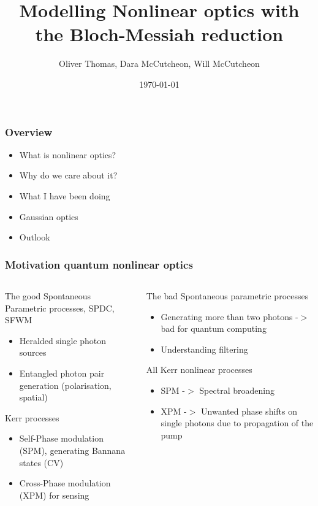\documentclass{beamer}
\title{Modelling Nonlinear optics with the Bloch-Messiah reduction}
\author{Oliver Thomas, Dara McCutcheon, Will McCutcheon}
\institute{Quantum Engineering CDT \\ University of Bristol}
\date{\today}
\begin{document}
\frame{\titlepage}

\begin{frame}
\frametitle{Overview}
\begin{itemize}
	\item What is nonlinear optics?
    \item Why do we care about it?
    \item What I have been doing
    \item Gaussian optics 
    \item Outlook
\end{itemize}
\end{frame}

\begin{frame}
\frametitle{Motivation quantum nonlinear optics}
\begin{columns}
    \begin{block}{The good}
    Spontaneous Parametric processes, SPDC, SFWM
    \begin{itemize}
        \item Heralded single photon sources
        \item Entangled photon pair generation (polarisation, spatial)
    \end{itemize}
    Kerr processes 
    \begin{itemize}
        \item Self-Phase modulation (SPM), generating Bannana states (CV)
        \item Cross-Phase modulation (XPM) for sensing
    \end{itemize}
    \end{block}
%
    \begin{block}{The bad}
        Spontaneous parametric processes
        \begin{itemize}
            \item Generating more than two photons -$>$ bad for quantum computing
            \item Understanding filtering
        \end{itemize}
        All Kerr nonlinear processes 
        \begin{itemize}
            \item SPM -$>$ Spectral broadening
            \item XPM -$>$ Unwanted phase shifts on single photons due to propagation of the pump 
        \end{itemize}
        \end{block}
\end{columns}

\end{frame}
\end{document}
